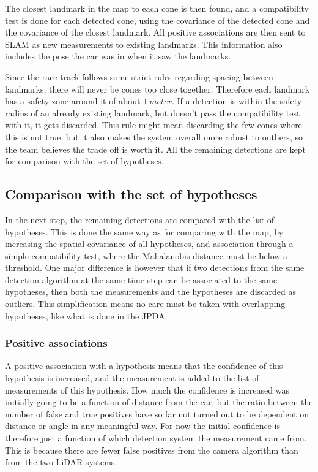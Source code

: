The closest landmark in the map to each cone is then found, and a compatibility test is done for each detected cone, using the covariance of the detected cone and the covariance of the closest landmark. All positive associations are then sent to SLAM as new measurements to existing landmarks. This information also includes the pose the car was in when it saw the landmarks. 

Since the race track follows some strict rules regarding spacing between landmarks, there will never be  cones too close together. Therefore each landmark has a safety zone around it of about $\SI{1}{meter}$. If a detection is within the safety radius of an already existing landmark, but doesn't pass the compatibility test with it, it gets discarded. This rule might mean discarding the few cones where this is not true, but it also makes the system overall more robust to outliers, so the team believes the trade off is worth it.  All the remaining detections are kept for comparison with the set of hypotheses. 

\subsection{Comparison with the set of hypotheses}

In the next step, the remaining detections are compared with the list of hypotheses. This is done the same way as for comparing with the map, by increasing the spatial covariance of all hypotheses, and association through a simple compatibility test, where the Mahalanobis distance must be below a threshold. One major difference is however that if two detections from the same detection algorithm at the same time step can be associated to the same hypotheses, then both the measurements and the hypotheses are discarded as outliers. This simplification means no care must be taken with overlapping hypotheses, like what is done in the \gls{JPDA}. 

\subsubsection{Positive associations}

A positive association with a hypothesis means that the confidence of this hypothesis is increased, and the measurement is added to the list of measurements of this hypothesis. How much the confidence is increased was initially going to be a function of distance from the car, but the ratio between the number of false and true positives have so far not turned out to be dependent on distance or angle in any meaningful way. For now the initial confidence is therefore just a function of which detection system the measurement came from. This is because there are fewer false positives from the camera algorithm than from the two \gls{LiDAR} systems. 

